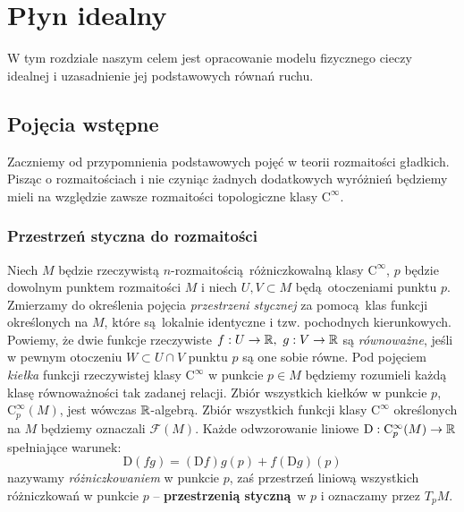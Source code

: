 \chapter{Płyn idealny} W tym rozdziale naszym celem jest opracowanie modelu fizycznego cieczy idealnej i uzasadnienie jej podstawowych równań ruchu.

\section{Pojęcia wstępne}
Zaczniemy od przypomnienia podstawowych pojęć w teorii rozmaitości gładkich. Pisząc o rozmaitościach i nie czyniąc żadnych dodatkowych wyróżnień będziemy mieli na względzie zawsze rozmaitości topologiczne klasy \(\mathrm{C}^{\infty}\).

\subsection{Przestrzeń styczna do rozmaitości}
Niech \(M\) będzie rzeczywistą \(n\)-rozmaitością różniczkowalną klasy \(\mathrm{C}^\infty\), \(p\) będzie dowolnym punktem rozmaitości \(M\) i niech \(U, V\subset M\) będą otoczeniami punktu \(p\). Zmierzamy do określenia pojęcia \emph{przestrzeni stycznej} za pomocą klas funkcji określonych na \(M\), które są lokalnie identyczne i tzw. pochodnych kierunkowych. Powiemy, że dwie funkcje rzeczywiste \(f:U\to\R,\ g:V\to\R\) są \emph{równoważne}, jeśli w pewnym otoczeniu \(W\subset U\cap V\) punktu \(p\) są one sobie równe. Pod pojęciem \emph{kiełka} funkcji rzeczywistej klasy \(\mathrm{C}^\infty\) w punkcie \(p\in M\) będziemy rozumieli każdą klasę równoważności tak zadanej relacji. Zbiór wszystkich kiełków w punkcie \(p\), \(\mathrm{C}_p^\infty(M)\), jest wówczas \(\mathbb{R}\)-algebrą. Zbiór wszystkich funkcji klasy \(\mathrm{C}^\infty\) określonych na \(M\) będziemy oznaczali \(\mathcal{F}(M)\).
Każde odwzorowanie liniowe \(\mathrm{D}:\mathrm{C}_p^\infty(M)\to\mathbb{R}\) spełniające warunek:
\begin{equation}\label{eq:differentiation}
    \mathrm{D}(fg) = (\mathrm{D}f)g(p) + f(\mathrm{D}g)(p)
\end{equation}
nazywamy \emph{różniczkowaniem} w punkcie \(p\), zaś przestrzeń liniową wszystkich różniczkowań w punkcie \(p\) -- \textbf{przestrzenią styczną} w \(p\) i oznaczamy przez \(T_pM\).


